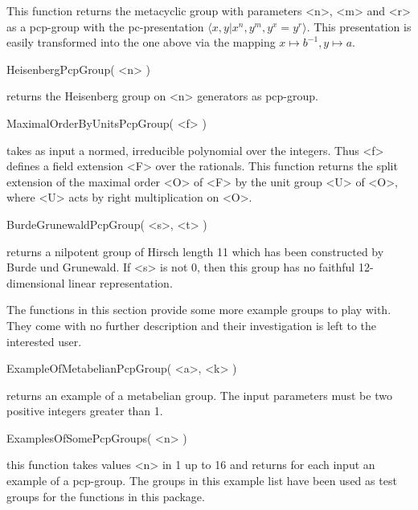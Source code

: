       This function returns the metacyclic group with parameters <n>,
      <m> and <r> as a pcp-group with the pc-presentation $\langle
      x,y | x^n, y^m, y^x = y^r\rangle$.  This presentation is easily
      transformed into the one above via the mapping $x\mapsto b^{-1},
      y \mapsto a$. 

\>HeisenbergPcpGroup( <n> )

      returns the Heisenberg group on <n> generators as pcp-group.

\>MaximalOrderByUnitsPcpGroup( <f> )

      takes as input a normed, irreducible polynomial over the integers.
      Thus <f> defines a field extension <F> over the rationals. This 
      function returns the split extension of the maximal order <O> of <F> 
      by the unit group <U> of <O>, where <U> acts by right multiplication
      on <O>.

\>BurdeGrunewaldPcpGroup( <s>, <t> )
   
      returns a nilpotent group of Hirsch length 11 which has been 
      constructed by Burde und Grunewald. If <s> is not 0, then this 
      group has no faithful 12-dimensional linear representation.


The functions in this section provide some more example groups to play
with. They come with no further description and their investigation is
left to the interested user.

\>ExampleOfMetabelianPcpGroup( <a>, <k> )

      returns an example of a metabelian group. The input parameters must
      be two positive integers greater than 1.

\>ExamplesOfSomePcpGroups( <n> )

      this function takes values <n> in 1 up to 16 and returns for each 
      input an example of a pcp-group. The groups in this example list 
      have been used as test groups for the functions in this package.

